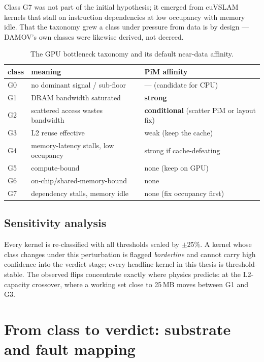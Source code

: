 Class G7 was not part of the initial hypothesis; it emerged from cuVSLAM
kernels that stall on instruction dependencies at low occupancy with memory
idle. That the taxonomy grew a class under pressure from data is by design
---DAMOV's own classes were likewise derived, not decreed.

\begin{table}[t]
\centering
\caption{The GPU bottleneck taxonomy and its default near-data affinity.}
\label{tab:taxonomy}
\begin{tabular}{@{}llp{}@{}}
\toprule
class & meaning & PiM affinity \\
\midrule
G0 & no dominant signal / sub-floor & --- (candidate for CPU) \\
G1 & DRAM bandwidth saturated & \textbf{strong} \\
G2 & scattered access wastes bandwidth & \textbf{conditional} (scatter PiM
or layout fix) \\
G3 & L2 reuse effective & weak (keep the cache) \\
G4 & memory-latency stalls, low occupancy & strong if cache-defeating \\
G5 & compute-bound & none (keep on GPU) \\
G6 & on-chip/shared-memory-bound & none \\
G7 & dependency stalls, memory idle & none (fix occupancy first) \\
\bottomrule
\end{tabular}
\end{table}

\subsection{Sensitivity analysis}
\label{sec:met-sensitivity}
Every kernel is re-classified with all thresholds scaled by $\pm 25\%$. A
kernel whose class changes under this perturbation is flagged
\emph{borderline} and cannot carry high confidence into the verdict stage;
every headline kernel in this thesis is threshold-stable. The observed
flips concentrate exactly where physics predicts: at the L2-capacity
crossover, where a working set close to 25\,MB moves between G1 and G3.

\section{From class to verdict: substrate and fault mapping}
\label{sec:met-verdict}


